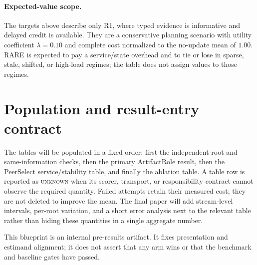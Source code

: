 \documentclass[sigconf,anonymous]{aamas}
\newcommand{\unknown}{\textsc{unknown}}
\begin{document}
\paragraph{Expected-value scope.} The targets above describe only R1, where typed evidence is informative and delayed credit is available. They are a conservative planning scenario with utility coefficient $\lambda=0.10$ and complete cost normalized to the no-update mean of $1.00$. RARE is expected to pay a service/state overhead and to tie or lose in sparse, stale, shifted, or high-load regimes; the table does not assign values to those regimes.

\section{Population and result-entry contract}

The tables will be populated in a fixed order: first the independent-root and
same-information checks, then the primary ArtifactRole result, then the
PeerSelect service/stability table, and finally the ablation table. A table row
is reported as \unknown{} when its scorer, transport, or responsibility contract
cannot observe the required quantity. Failed attempts retain their measured cost;
they are not deleted to improve the mean. The final paper will add stream-level
intervals, per-root variation, and a short error analysis next to the relevant
table rather than hiding these quantities in a single aggregate number.

This blueprint is an internal pre-results artifact. It fixes presentation and
estimand alignment; it does not assert that any arm wins or that the benchmark
and baseline gates have passed.
\end{document}
